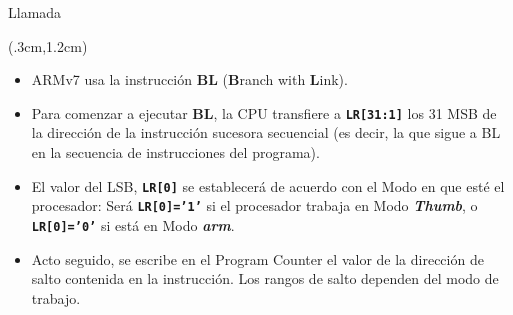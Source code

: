 \documentclass[usenames,table,dvipsnames,aspectratio=169]{beamer}
\newcommand{\arm}{\textbf{\textit{arm}}}
\newcommand{\Thumb}{\textbf{\textit{Thumb}}}
\newcommand{\Thdos}{\textbf{\textit{Thumb-2}}}
\begin{document}
\begin{frame}{Llamada}
 \begin{textblock*}{\textwidth}(.3cm,1.2cm)
  \begin{itemize}[<+(1)->] \justifying \parskip 0.15cm
   \item ARMv7 usa la instrucción \textbf{BL} (\textbf{B}ranch with \textbf{L}ink).
   \item Para comenzar a ejecutar \textbf{BL}, la CPU transfiere a \textbf{\texttt{LR[31:1]}} los 31 MSB de la dirección de la instrucción sucesora secuencial (es decir, la que sigue a BL en la secuencia de instrucciones del programa). 
   \item El valor del LSB, \textbf{\texttt{LR[0]}} se establecerá de acuerdo con el Modo en que esté el procesador: Será \textbf{\texttt{LR[0]='1'}} si el procesador trabaja en Modo \Thumb, o \textbf{\texttt{LR[0]='0'}} si está en Modo \arm.
   \item Acto seguido, se escribe en el Program Counter el valor de la dirección de salto contenida en la instrucción. Los rangos de salto dependen del modo de trabajo.
  \end{itemize}
 \end{textblock*}
\end{frame}
\end{document}
